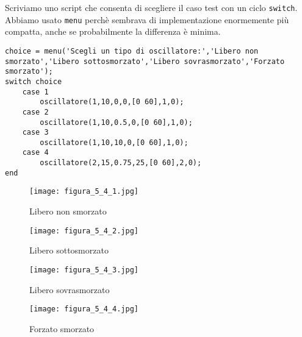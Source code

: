 \documentclass{article}
\begin{document}
\noindent
Scriviamo uno script che consenta di scegliere il caso test con un ciclo \texttt{switch}. Abbiamo usato \texttt{menu} perchè sembrava di implementazione enormemente più compatta, anche se probabilmente la differenza è minima.

\begin{lstlisting}
choice = menu('Scegli un tipo di oscillatore:','Libero non smorzato','Libero sottosmorzato','Libero sovrasmorzato','Forzato smorzato');
switch choice
    case 1
        oscillatore(1,10,0,0,[0 60],1,0);
    case 2
        oscillatore(1,10,0.5,0,[0 60],1,0);
    case 3
        oscillatore(1,10,10,0,[0 60],1,0);
    case 4
        oscillatore(2,15,0.75,25,[0 60],2,0);
end
\end{lstlisting}

\begin{figure}[!h]
\centering
\texttt{[image: figura\_5\_4\_1.jpg]}
\caption{Libero non smorzato}
\end{figure}

\begin{figure}[!h]
\centering
\texttt{[image: figura\_5\_4\_2.jpg]}
\caption{Libero sottosmorzato}
\end{figure}

\begin{figure}[!h]
\centering
\texttt{[image: figura\_5\_4\_3.jpg]}
\caption{Libero sovrasmorzato}
\end{figure}

\begin{figure}[!h]
\centering
\texttt{[image: figura\_5\_4\_4.jpg]}
\caption{Forzato smorzato}
\end{figure}

\clearpage
\end{document}
